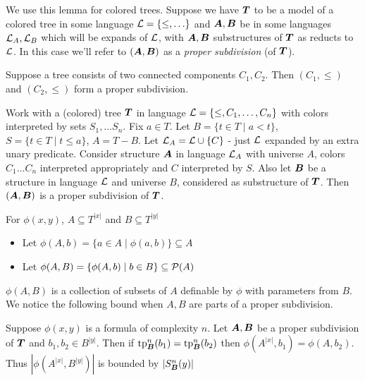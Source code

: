 \documentclass{amsart}
\DeclareMathOperator{\TT}{\boldface T}
\DeclareMathOperator{\A}{\boldface A}
\DeclareMathOperator{\B}{\boldface B}
\begin{document}
We use this lemma for colored trees. Suppose we have $\TT$ to be a model of a colored tree in some language $\mathcal L = \{\leq, \ldots\}$ and $\A, \B$ be in some languages $\mathcal L_A, \mathcal L_B$ which will be expands of $\mathcal L$, with $\A, \B$ substructures of $\TT$ as reducts to $\mathcal L$. In this case we'll refer to $(\A, \B)$ as a \emph{proper subdivision} (of $\TT$).

\begin{Example}
	Suppose a tree consists of two connected components $C_1, C_2$. Then $(C_1, \leq)$ and $(C_2, \leq)$ form a proper subdivision.
\end{Example}

\begin{Example} \label{ex_cone}
	Work with a (colored) tree $\TT$ in language $\mathcal L = \{\leq, C_1, \ldots, C_n\}$ with colors interpreted by sets $S_1, \ldots S_n$. Fix $a \in T$. Let $B = \{t \in T \mid a < t\}$, $S = \{t \in T \mid t \leq a\}$, $A = T - B$. Let $\mathcal L_A = \mathcal L \cup \{C\}$ - just $\mathcal L$ expanded by an extra unary predicate. Consider structure $\A$ in language $\mathcal L_A$ with universe $A$, colors $C_1 \ldots C_n$ interpreted appropriately and $C$ interpreted by $S$. Also let $\B$ be a structure in language $\mathcal L$ and universe $B$, considered as substructure of $\TT$.	Then $(\A, \B)$ is a proper subdivision of $\TT$.
\end{Example}

\begin{Definition} For $\phi(x, y)$, $A \subseteq T^{|x|}$ and $B \subseteq T^{|y|}$
\begin{itemize}
	\item Let $\phi(A, b) = \{a \in A \mid \phi(a, b)\} \subseteq A$
	\item Let $\phi(A, B) = \{\phi(A, b) \mid b \in B\} \subseteq \mathcal P(A)$	
\end{itemize}
\end{Definition}
$\phi(A, B)$ is a collection of subsets of $A$ definable by $\phi$ with parameters from $B$. We notice the following bound when $A, B$ are parts of a proper subdivision.

\begin{Corollary} \label{cor_type_count}
	Suppose $\phi(x,y)$ is a formula of complexity $n$. Let $\A, \B$ be a proper subdivision of $\TT$ and $b_1, b_2 \in B^{|y|}$. Then if $\tp^n_{\B}(b_1) = \tp^n_{\B}(b_2)$ then $\phi(A^{|x|}, b_1) = \phi(A, b_2)$. Thus $|\phi(A^{|x|}, B^{|y|})|$ is bounded by $|S^n_{\B}(y)|$
\end{Corollary}
\end{document}

